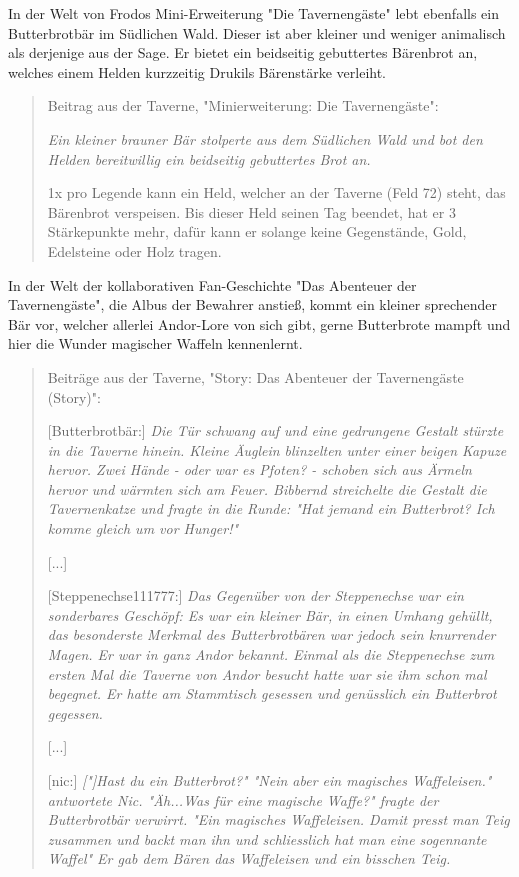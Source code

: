 \documentclass[10pt, a4paper, oneside]{book}
\begin{document}
{In der Welt von Frodos Mini-Erweiterung "Die Tavernengäste" lebt ebenfalls ein Butterbrotbär im Südlichen Wald. Dieser ist aber kleiner und weniger animalisch als derjenige aus der Sage. Er bietet ein beidseitig gebuttertes Bärenbrot an, welches einem Helden kurzzeitig Drukils Bärenstärke verleiht.

\begin{quote}
    Beitrag aus der Taverne, "Minierweiterung: Die Tavernengäste": 
    
    \textit{Ein kleiner brauner Bär stolperte aus dem Südlichen Wald und bot den Helden bereitwillig ein beidseitig gebuttertes Brot an.} 
    
    1x pro Legende kann ein Held, welcher an der Taverne (Feld 72) steht, das Bärenbrot verspeisen. Bis dieser Held seinen Tag beendet, hat er 3 Stärkepunkte mehr, dafür kann er solange keine Gegenstände, Gold, Edelsteine oder Holz tragen.
\end{quote}

In der Welt der kollaborativen Fan-Geschichte "Das Abenteuer der Tavernengäste", die Albus der Bewahrer anstieß, kommt ein kleiner sprechender Bär vor, welcher allerlei Andor-Lore von sich gibt, gerne Butterbrote mampft und hier die Wunder magischer Waffeln kennenlernt.

\begin{quote}
    Beiträge aus der Taverne, "Story: Das Abenteuer der Tavernengäste (Story)": 
    
    [Butterbrotbär:] \textit{Die Tür schwang auf und eine gedrungene Gestalt stürzte in die Taverne hinein. Kleine Äuglein blinzelten unter einer beigen Kapuze hervor. Zwei Hände - oder war es Pfoten? - schoben sich aus Ärmeln hervor und wärmten sich am Feuer. Bibbernd streichelte die Gestalt die Tavernenkatze und fragte in die Runde: "Hat jemand ein Butterbrot? Ich komme gleich um vor Hunger!"} 

    [...]
    
    [Steppenechse111777:] \textit{Das Gegenüber von der Steppenechse war ein sonderbares Geschöpf: Es war ein kleiner Bär, in einen Umhang gehüllt, das besonderste Merkmal des Butterbrotbären war jedoch sein knurrender Magen. Er war in ganz Andor bekannt. Einmal als die Steppenechse zum ersten Mal die Taverne von Andor besucht hatte war sie ihm schon mal begegnet. Er hatte am Stammtisch gesessen und genüsslich ein Butterbrot gegessen.} 

    [...]
    
    [nic:] \textit{["]Hast du ein Butterbrot?" "Nein aber ein magisches Waffeleisen." antwortete Nic. "Äh...Was für eine magische Waffe?" fragte der Butterbrotbär verwirrt. "Ein magisches Waffeleisen. Damit presst man Teig zusammen und backt man ihn und schliesslich hat man eine sogennante Waffel" Er gab dem Bären das Waffeleisen und ein bisschen Teig.}
\end{quote}


}
\end{document}
